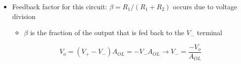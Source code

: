 \begin{itemize}
\begin{itemize}
      \item Feedback factor for this circuit: $\beta=R_1/(R_1+R_2)$ occurs due to voltage division

        \begin{itemize}

          \item $\beta$ is the fraction of the output that is fed back to the $V_-$ terminal

        \end{itemize}

        $$V_o=(V_+-V_-)A_{OL}=-V_-A_{OL}\to V_-=\frac{-V_o}{A_{OL}}$$

    \end{itemize}

\end{itemize}



